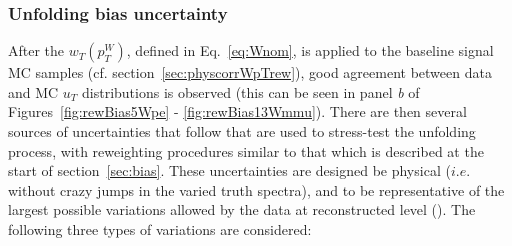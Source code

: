 \subsubsection{Unfolding bias uncertainty}
\label{sec:ptwbias_unc}
After the $w_{T}(p_{T}^{W})$, defined in Eq.~\ref{eq:Wnom}, is applied to the baseline \POWHEG signal MC samples (cf. section~\ref{sec:physcorrWpTrew}), good agreement between data and MC $u_{T}$ distributions is observed (this can be seen in panel \textit{b} of Figures~\ref{fig:rewBias5Wpe} - \ref{fig:rewBias13Wmmu}).
There are then several sources of uncertainties that follow that are used to stress-test the unfolding process, with reweighting procedures similar to that which is described at the start of section~\ref{sec:bias}. These uncertainties are designed be physical ($i.e.$ without crazy jumps in the varied truth spectra), and to be representative of the largest possible variations allowed by the data at reconstructed level (\ut).
The following three types of variations are considered:
